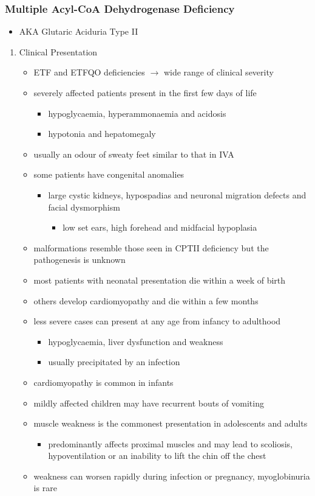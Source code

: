 \documentclass[12pt]{scrartcl}
\begin{document}
\subsubsection{Multiple Acyl-CoA Dehydrogenase Deficiency}
\label{sec:org2f21a13}
\begin{itemize}
\item AKA Glutaric Aciduria Type II
\end{itemize}
\begin{enumerate}
\item Clinical Presentation
\label{sec:orgfa1e351}
\begin{itemize}
\item ETF and ETFQO deficiencies \(\to\) wide range of clinical severity
\item severely affected patients present in the first few days of life
\begin{itemize}
\item hypoglycaemia, hyperammonaemia and acidosis
\item hypotonia and hepatomegaly
\end{itemize}
\item usually an odour of sweaty feet similar to that in IVA
\item some patients have congenital anomalies
\begin{itemize}
\item large cystic kidneys, hypospadias and neuronal migration defects and facial dysmorphism
\begin{itemize}
\item low set ears, high forehead and midfacial hypoplasia
\end{itemize}
\end{itemize}
\item malformations resemble those seen in CPTII deficiency but the pathogenesis is unknown
\item most patients with neonatal presentation die within a week of birth
\item others develop cardiomyopathy and die within a few months
\item less severe cases can present at any age from infancy to adulthood
\begin{itemize}
\item hypoglycaemia, liver dysfunction and weakness
\item usually precipitated by an infection
\end{itemize}
\item cardiomyopathy is common in infants
\item mildly affected children may have recurrent bouts of vomiting
\item muscle weakness is the commonest presentation in adolescents and adults
\begin{itemize}
\item predominantly affects proximal muscles and may lead to scoliosis,
hypoventilation or an inability to lift the chin off the chest
\end{itemize}
\item weakness can worsen rapidly during infection or pregnancy, myoglobinuria is rare
\end{itemize}


\end{enumerate}
\end{document}
